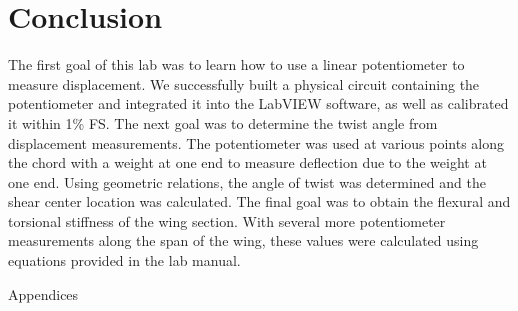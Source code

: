\documentclass{article}
\begin{document}
\section{Conclusion}
The first goal of this lab was to learn how to use a linear potentiometer to measure displacement.  
We successfully built a physical circuit containing the potentiometer and integrated it into the LabVIEW software, as well as calibrated it within 1\% FS.  
The next goal was to determine the twist angle from displacement measurements.  The potentiometer was used at various points along the chord with a weight at one end to measure deflection due to the weight at one end.  
Using geometric relations, the angle of twist was determined and the shear center location was calculated.  The final goal was to obtain the flexural and torsional stiffness of the wing section.  With several more potentiometer measurements along the span of the wing, these values were calculated 
using equations provided in the lab manual.  
\newpage
\thispagestyle{empty}  %
\begin{center}
	\vspace*{\fill}
	{\Huge Appendices}
	\vspace*{\fill}
\end{center}
\end{document}
